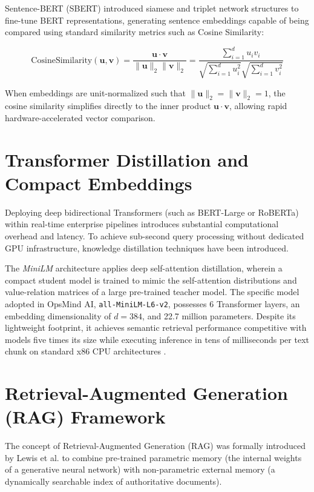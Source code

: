 Sentence-BERT (SBERT) \cite{reimers2019sentence} introduced siamese and triplet network structures to fine-tune BERT representations, generating sentence embeddings capable of being compared using standard similarity metrics such as Cosine Similarity:

\begin{equation}
\text{CosineSimilarity}(\mathbf{u}, \mathbf{v}) = \frac{\mathbf{u} \cdot \mathbf{v}}{\|\mathbf{u}\|_2 \|\mathbf{v}\|_2} = \frac{\sum_{i=1}^d u_i v_i}{\sqrt{\sum_{i=1}^d u_i^2} \sqrt{\sum_{i=1}^d v_i^2}}
\label{eq:cosine_similarity}
\end{equation}

When embeddings are unit-normalized such that $\|\mathbf{u}\|_2 = \|\mathbf{v}\|_2 = 1$, the cosine similarity simplifies directly to the inner product $\mathbf{u} \cdot \mathbf{v}$, allowing rapid hardware-accelerated vector comparison.

\section{Transformer Distillation and Compact Embeddings}
\label{sec:lit_minilm}

Deploying deep bidirectional Transformers (such as BERT-Large or RoBERTa) within real-time enterprise pipelines introduces substantial computational overhead and latency. To achieve sub-second query processing without dedicated GPU infrastructure, knowledge distillation techniques have been introduced.

The \emph{MiniLM} architecture \cite{wang2020minilm} applies deep self-attention distillation, wherein a compact student model is trained to mimic the self-attention distributions and value-relation matrices of a large pre-trained teacher model. The specific model adopted in OpsMind AI, \texttt{all-MiniLM-L6-v2}, possesses 6 Transformer layers, an embedding dimensionality of $d = 384$, and 22.7 million parameters. Despite its lightweight footprint, it achieves semantic retrieval performance competitive with models five times its size while executing inference in tens of milliseconds per text chunk on standard x86 CPU architectures \cite{xenova2023transformersjs}.

\section{Retrieval-Augmented Generation (RAG) Framework}
\label{sec:lit_rag}

The concept of Retrieval-Augmented Generation (RAG) was formally introduced by Lewis et al. \cite{lewis2020retrieval} to combine pre-trained parametric memory (the internal weights of a generative neural network) with non-parametric external memory (a dynamically searchable index of authoritative documents).

